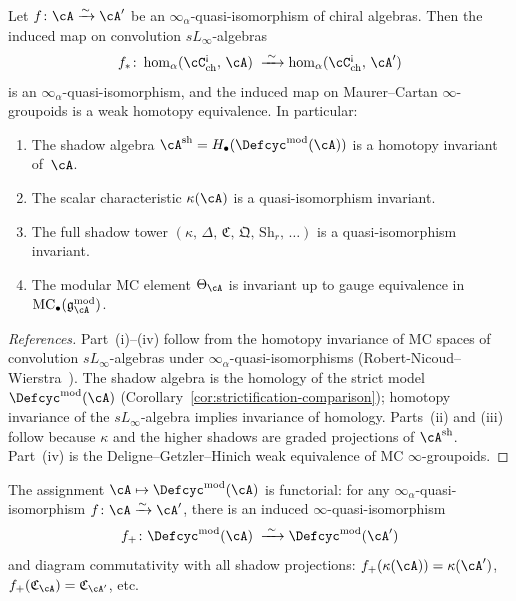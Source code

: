 \begin{theorem}
\label{thm:shadow-homotopy-invariance}
Let $f\colon \cA \xrightarrow{\sim} \cA'$ be an
$\infty_\alpha$-quasi-isomorphism of chiral algebras.  Then
the induced map on convolution $sL_\infty$-algebras
\[
f_*\colon
\operatorname{hom}_\alpha(\cC^{\textup{!`}}_{\mathrm{ch}},\, \cA)
\;\xrightarrow{\;\sim\;}
\operatorname{hom}_\alpha(\cC^{\textup{!`}}_{\mathrm{ch}},\, \cA')
\]
is an $\infty_\alpha$-quasi-isomorphism, and the induced map on
Maurer--Cartan $\infty$-groupoids is a weak homotopy equivalence.
In particular:
\begin{enumerate}[label=\textup{(\roman*)}]
\item The shadow algebra
  $\cA^{\mathrm{sh}} = H_\bullet(\Defcyc^{\mathrm{mod}}(\cA))$ is a
  homotopy invariant of~$\cA$.
\item The scalar characteristic $\kappa(\cA)$ is a
  quasi-isomorphism invariant.
\item The full shadow tower
  $(\kappa,\, \Delta,\, \mathfrak{C},\, \mathfrak{Q},\,
  \mathrm{Sh}_r,\, \ldots)$ is a quasi-isomorphism invariant.
\item The modular MC element $\Theta_\cA$ is invariant up to gauge
  equivalence in $\mathrm{MC}_\bullet(\mathfrak{g}_\cA^{\mathrm{mod}})$.
\end{enumerate}
\end{theorem}

\begin{proof}[References]
Part~(i)--(iv) follow from the homotopy invariance of MC spaces of
convolution $sL_\infty$-algebras under $\infty_\alpha$-quasi-isomorphisms
(Robert-Nicoud--Wierstra~\cite[Section~8]{RNW19}).  The shadow algebra is
the homology of the strict model $\Defcyc^{\mathrm{mod}}(\cA)$
(Corollary~\ref{cor:strictification-comparison}); homotopy invariance of the
$sL_\infty$-algebra implies invariance of homology.  Parts~(ii) and (iii)
follow because $\kappa$ and the higher shadows are graded projections
of $\cA^{\mathrm{sh}}$.  Part~(iv) is the Deligne--Getzler--Hinich
weak equivalence of MC $\infty$-groupoids.
\end{proof}

\begin{corollary}
\label{cor:deformation-functoriality}
The assignment $\cA \mapsto \Defcyc^{\mathrm{mod}}(\cA)$ is
functorial: for any $\infty_\alpha$-quasi-isomorphism
$f\colon \cA \xrightarrow{\sim} \cA'$, there is an induced
$\infty$-quasi-isomorphism
\[
f_+\colon \Defcyc^{\mathrm{mod}}(\cA)
\;\xrightarrow{\;\sim\;}
\Defcyc^{\mathrm{mod}}(\cA')
\]
and diagram commutativity with all shadow projections:
$f_+(\kappa(\cA)) = \kappa(\cA')$,
$f_+(\mathfrak{C}_\cA) = \mathfrak{C}_{\cA'}$, etc.
\end{corollary}

